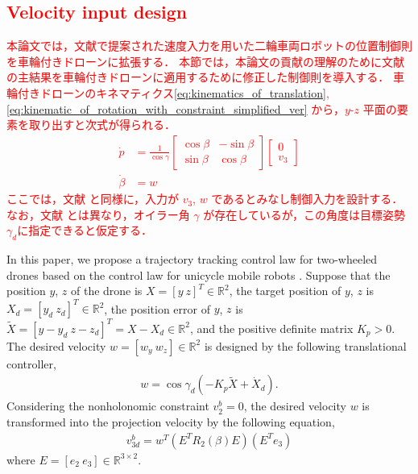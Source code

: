 \textcolor{red}{
\subsection{Velocity input design}
\label{subsec:controller_of_translation}
    本論文では，文献\cite{rodriguez-cortesNewGeometricTrajectory2022}で提案された速度入力を用いた二輪車両ロボットの位置制御則を車輪付きドローンに拡張する．
    本節では，本論文の貢献の理解のために文献\cite{rodriguez-cortesNewGeometricTrajectory2022}の主結果を車輪付きドローンに適用するために修正した制御則を導入する．
    車輪付きドローンのキネマティクス\eqref{eq:kinematics_of_translation}, \eqref{eq:kinematic_of_rotation_with_constraint_simplified_ver} から，$y$-$z$ 平面の要素を取り出すと次式が得られる．
    \begin{align}
        \dot{p} &= \frac{1}{\cos \gamma}
        \begin{bmatrix}
            \cos \beta & -\sin \beta \\
            \sin \beta & \cos \beta
        \end{bmatrix}
        \begin{bmatrix}
            0 \\
            v_3   
        \end{bmatrix} \\
        \dot{\beta} &= w
    \end{align}
    ここでは，文献\cite{rodriguez-cortesNewGeometricTrajectory2022} と同様に，入力が $v_3$, $w$ であるとみなし制御入力を設計する．
    なお，文献 \cite{rodriguez-cortesNewGeometricTrajectory2022}とは異なり，オイラー角 $\gamma$ が存在しているが，この角度は目標姿勢$\gamma_d$に指定できると仮定する．
}
In this paper, we propose a trajectory tracking control law for two-wheeled drones based on the control law for unicycle mobile robots \cite{rodriguez-cortesNewGeometricTrajectory2022}.
Suppose that the position $ y $, $ z $ of the drone is $ X = [y ~ z]^T \in \mathbb{R}^2 $, the target position of $ y $, $ z $ is $ X_d = [y_d ~ z_d]^T \in \mathbb{R}^2 $, the position error of $ y $, $ z $ is $ \tilde{X} = [y - y_d ~ z - z_d ]^T = X - X_d \in \mathbb{R}^2 $, and the positive definite matrix $ K_p > 0 $.
The desired velocity $ w = [w_y ~ w_z] \in \mathbb{R}^2 $ is designed by the following translational controller,
\begin{align}
    \label{eq:kin_inp_trans}
    w = \cos \gamma_d ( - K_p \tilde{X} + \dot{X}_d ).
\end{align}
Considering the nonholonomic constraint $ v_2^b = 0 $, the desired velocity $ w $ is transformed into the projection velocity by the following equation,
\begin{align}
    v_{3d}^b = w^T \left ( E^T R_2 \left (\beta \right ) E \right ) \left ( E^T e_3 \right )
\end{align}
where $ E = [e_2 ~ e_3] \in \mathbb{R}^{3 \times 2} $.


